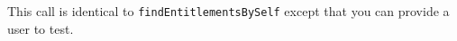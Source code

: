 This call is identical to \verb+findEntitlementsBySelf+ except that you can provide a user to test.
